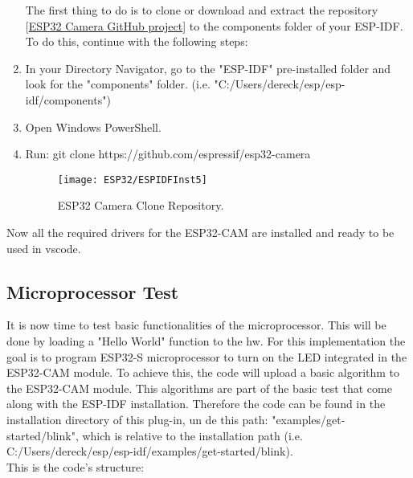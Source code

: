 \begin{enumerate}
    The first thing to do is to clone or download and extract the repository [\href{https://github.com/espressif/esp32-camera}{ESP32 Camera GitHub project}] to the components folder of your ESP-IDF. To do this, continue with the following steps:
    \item In your Directory Navigator, go to the "ESP-IDF" pre-installed folder and look for the "components" folder. (i.e. "C:/Users/dereck/esp/esp-idf/components")
    \item Open Windows PowerShell.
    \item Run: git clone https://github.com/espressif/esp32-camera
    \begin{figure}  [H]
        \begin{center}
            \texttt{[image: ESP32/ESPIDFInst5]}
            \caption{ESP32 Camera Clone Repository.} 
            \label{fig:ESP32 Camera Clone Repository.}
        \end{center}
    \end{figure}	
\end{enumerate}

Now all the required drivers for the ESP32-CAM are installed and ready to be used in \ac{vscode}.


\subsection{Microprocessor Test}    
                                                            
It is now time to test basic functionalities of the microprocessor. This will be done by loading a "Hello World" function to the \ac{hw}. For this implementation the goal is to program ESP32-S microprocessor to turn on the LED integrated in the ESP32-CAM module. To achieve this, the code will upload a basic algorithm to the ESP32-CAM module. This algorithms are part of the basic test that come along with the ESP-IDF installation. Therefore the code can be found in the installation directory of this plug-in, un de this path: "examples/get-started/blink", which is relative to the installation path (i.e. C:/Users/dereck/esp/esp-idf/examples/get-started/blink).  \\

This is the code's structure:

